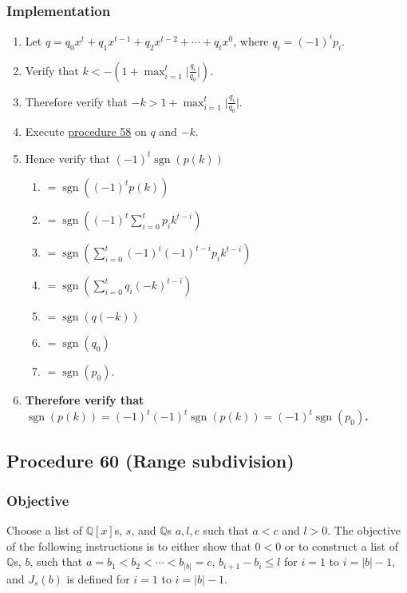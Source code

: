 \documentclass[twocolumn]{article}
\DeclareMathOperator{\sgn}{sgn}
\begin{document}
			\subsubsection{Implementation}
				\begin{enumerate}
					\item Let $q=q_0x^t+q_1x^{t-1}+q_2x^{t-2}+\cdots+q_tx^0$, where $q_i=(-1)^ip_i$.
					\item Verify that $k<-(1+\max_{i=1}^t\lvert\frac{q_i}{q_0}\rvert)$.
					\item Therefore verify that $-k>1+\max_{i=1}^t\lvert\frac{q_i}{q_0}\rvert$.
					\item Execute \hyperref[sec:procedure 58]{procedure 58} on $q$ and $-k$.
					\item Hence verify that $(-1)^t\sgn(p(k))$
					\begin{enumerate}
						\item $=\sgn((-1)^tp(k))$
						\item $=\sgn((-1)^t\sum_{i=0}^t p_ik^{t-i})$
						\item $=\sgn(\sum_{i=0}^t (-1)^i(-1)^{t-i}p_ik^{t-i})$
						\item $=\sgn(\sum_{i=0}^t q_i(-k)^{t-i})$
						\item $=\sgn(q(-k))$
						\item $=\sgn(q_0)$
						\item $=\sgn(p_0)$.
					\end{enumerate}
					\item \textbf{Therefore verify that $\sgn(p(k))=(-1)^t(-1)^t\sgn(p(k))=(-1)^t\sgn(p_0)$.}
				\end{enumerate}
		\subsection{Procedure 60 (Range subdivision)}\label{sec:procedure 60}
			\subsubsection{Objective}
				Choose a list of $\mathbb{Q}[x]$s, $s$, and $\mathbb{Q}$s $a,l,c$ such that $a<c$ and $l>0$. The objective of the following instructions is to either show that $0<0$ or to construct a list of $\mathbb{Q}$s, $b$, such that $a=b_1<b_2<\cdots<b_{\lvert b\rvert}=c$, $b_{i+1}-b_i\le l$ for $i=1$ to $i=\lvert b\rvert-1$, and $J_s(b)$ is defined for $i=1$ to $i=\lvert b\rvert-1$.
\end{document}
